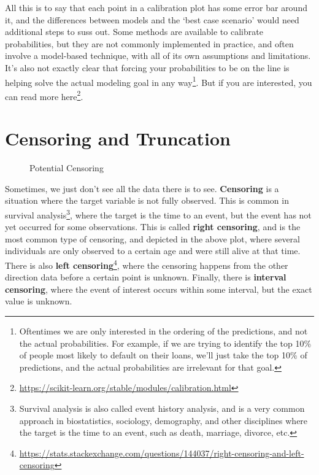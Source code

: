 \documentclass[
  letterpaper,
]{krantz}
\DeclareRobustCommand{\href}[2]{#2\footnote{\url{#1}}}
\begin{document}
All this is to say that each point in a calibration plot has some error
bar around it, and the differences between models and the `best case
scenario' would need additional steps to suss out. Some methods are
available to calibrate probabilities, but they are not commonly
implemented in practice, and often involve a model-based technique, with
all of its own assumptions and limitations. It's also not exactly clear
that forcing your probabilities to be on the line is helping solve the
actual modeling goal in any way\footnote{Oftentimes we are only
  interested in the ordering of the predictions, and not the actual
  probabilities. For example, if we are trying to identify the top 10\%
  of people most likely to default on their loans, we'll just take the
  top 10\% of predictions, and the actual probabilities are irrelevant
  for that goal.}. But if you are interested, you can read more
\href{https://scikit-learn.org/stable/modules/calibration.html}{here}.

\section{Censoring and Truncation}\label{sec-data-censoring}

\begin{figure}[H]


\caption{\label{fig-censoring}Potential Censoring}

\end{figure}%

Sometimes, we just don't see all the data there is to see.
\textbf{Censoring} is a situation where the target variable is not fully
observed. This is common in survival analysis\footnote{Survival analysis
  is also called event history analysis, and is a very common approach
  in biostatistics, sociology, demography, and other disciplines where
  the target is the time to an event, such as death, marriage, divorce,
  etc.}, where the target is the time to an event, but the event has not
yet occurred for some observations. This is called \textbf{right
censoring}, and is the most common type of censoring, and depicted in
the above plot, where several individuals are only observed to a certain
age and were still alive at that time. There is also
\href{https://stats.stackexchange.com/questions/144037/right-censoring-and-left-censoring}{\textbf{left
censoring}}, where the censoring happens from the other direction data
before a certain point is unknown. Finally, there is \textbf{interval
censoring}, where the event of interest occurs within some interval, but
the exact value is unknown.
\end{document}
